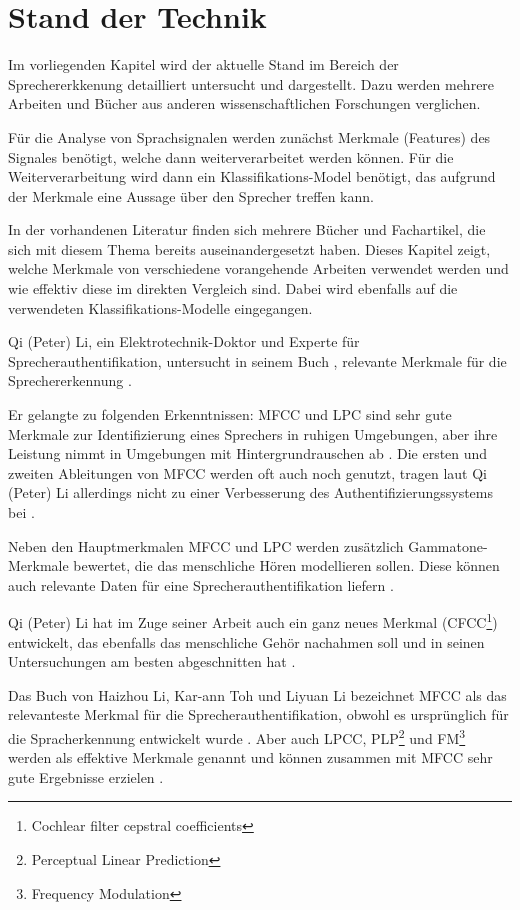\section{Stand der Technik} \label{sec:StandDerTechnik}
Im vorliegenden Kapitel wird der aktuelle Stand im Bereich der Sprechererkkenung detailliert untersucht und dargestellt.
Dazu werden mehrere Arbeiten und Bücher aus anderen wissenschaftlichen Forschungen verglichen.

Für die Analyse von Sprachsignalen werden zunächst Merkmale (Features) des Signales benötigt, welche dann weiterverarbeitet werden können.
Für die Weiterverarbeitung wird dann ein Klassifikations-Model benötigt, das aufgrund der Merkmale eine Aussage über den Sprecher treffen kann.

In der vorhandenen Literatur finden sich mehrere Bücher und Fachartikel, die sich mit diesem Thema bereits auseinandergesetzt haben. 
Dieses Kapitel zeigt, welche Merkmale von verschiedene vorangehende Arbeiten verwendet werden und wie effektiv diese im direkten Vergleich sind. Dabei wird ebenfalls auf die verwendeten Klassifikations-Modelle eingegangen.

Qi (Peter) Li, ein Elektrotechnik-Doktor und Experte für Sprecherauthentifikation, untersucht in seinem Buch , relevante Merkmale für die Sprechererkennung \autocite{li_speaker_2012}.

Er gelangte zu folgenden Erkenntnissen:
\ac{MFCC} und \ac{LPC} sind sehr gute Merkmale zur Identifizierung eines Sprechers in ruhigen Umgebungen, aber ihre Leistung nimmt in Umgebungen mit Hintergrundrauschen ab \autocite[vgl.][S. 136]{li_speaker_2012}.
Die ersten und zweiten Ableitungen von \ac{MFCC} werden oft auch noch genutzt, tragen laut Qi (Peter) Li allerdings nicht zu einer Verbesserung des Authentifizierungssystems bei \autocite[vgl.][S. 143]{li_speaker_2012}.

Neben den Hauptmerkmalen \ac{MFCC} und \ac{LPC} werden zusätzlich Gammatone-Merkmale bewertet, die das menschliche Hören modellieren sollen.
Diese können auch relevante Daten für eine Sprecherauthentifikation liefern \autocite[vgl.][S. 111, 117]{li_speaker_2012}.

Qi (Peter) Li hat im Zuge seiner Arbeit auch ein ganz neues Merkmal (CFCC\footnote{Cochlear filter cepstral coefficients}) entwickelt, das ebenfalls das menschliche Gehör nachahmen soll und in seinen Untersuchungen am besten abgeschnitten hat \autocite[vgl.][S. 135]{li_speaker_2012}.

Das Buch  von Haizhou Li, Kar-ann Toh und Liyuan Li bezeichnet \ac{MFCC} als das relevanteste Merkmal für die Sprecherauthentifikation, obwohl es ursprünglich für die Spracherkennung entwickelt wurde \autocite[vgl.][S. 7, 51]{li_advanced_2011}.
Aber auch \ac{LPCC}, PLP\footnote{Perceptual Linear Prediction} und FM\footnote{Frequency Modulation} werden als effektive Merkmale genannt und können zusammen mit \ac{MFCC} sehr gute Ergebnisse erzielen \autocite[vgl.][S. 6, 67]{li_advanced_2011}.

